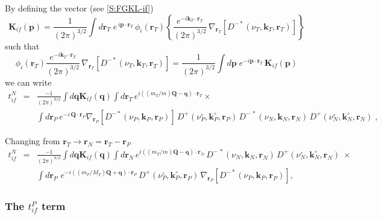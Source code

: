 By defining the vector (see \ref{S:FGKL-if})
\begin{equation}\label{Q:Kif}
  \bm{K}_{if}(\bm{p}) = \frac{1}{(2 \pi)^{3/2}} \int d \bm{r}_{T} \;
e^{\, i \bm{p} \cdot \bm{r}_{T}} \, \phi_{i}(\bm{r}_{T}) \left\{
\frac{e^{- i \bm{k}_{T} \cdot \bm{r}_{T}}}{(2
\pi)^{3/2}}\,\nabla_{\bm{r}_{T}} \left[
D^{-*}(\nu_{T},\bm{k}_{T},\bm{r}_{T}) \right] \right\}
\end{equation}
%
such that
\begin{equation}\label{Q:Fif-inv}
\phi_{i}(\bm{r}_{T}) \frac{ e^{- i \bm{k}_{T} \cdot \bm{r}_{T}}}
{(2 \pi)^{3/2}} \,\nabla_{\bm{r}_{T}} \left[
D^{-*}(\nu_{T},\bm{k}_{T},\bm{r}_{T}) \right]  = \frac{1}{(2
\pi)^{3/2}} \int d \bm{p} \; e^{- i \bm{p} \cdot \bm{r}_{T}}
\,\bm{K}_{if}(\bm{p})
\end{equation}
%
we can write
\begin{eqnarray*}
t^{N}_{if}&=& \frac{-1}{(2 \pi)^{9/2}} \int d \bm{q}
\bm{K}_{if}(\bm{q}) \int d \bm{r}_{T} \, e^{i \left(
(m_{T}/m)\bm{Q} - \bm{q} \right) \cdot \bm{r}_{T}} {\times}
  \\
&& \int d \bm{r}_{P} \, e^{- i \, \bm{Q} \cdot \bm{r}_{P}}
\nabla_{\bm{r}_{P}}\left[ D^{-*}(\nu_{P},\bm{k}_{P},\bm{r}_{P}) \right]
\, D^{+}(\nu_{P}^{\circ},\bm{k}_{P}^{\circ},\bm{r}_{P}) \, D^{-\,\ast}(\nu_{N},
\bm{k}_{N}, \bm{r}_{N} ) \, D^{+}(\nu_{N}^{\circ}, \bm{k}_{N}^{\circ}, \bm{r}_{N}) \;
,\nonumber
\end{eqnarray*}

Changing from $\bm{r}_{T} \to \bm{r}_{N}= \bm{r}_{T} - \bm{r}_{P}$
\begin{eqnarray} \label{Q:tifcdws1}
t^{N}_{if}&=& \frac{-1}{(2 \pi)^{9/2}} \int d \bm{q}
\bm{K}_{if}(\bm{q}) \int d \bm{r}_{N} \, e^{i \left(
(m_{T}/m)\bm{Q} - \bm{q} \right) \cdot \bm{r}_{N}} \,
 D^{-\,\ast}(\nu_{N},
\bm{k}_{N}, \bm{r}_{N} ) \, D^{+}(\nu_{N}^{\circ},\bm{k}_{N}^{\circ},\bm{r}_{N})\; {\times}
  \\
&& \int d \bm{r}_{P} \, \,e^{ -i \left((m_{T}/M_{T})\bm{Q}+
\bm{q} \right) \cdot \bm{r}_{P}} \,
D^{+}(\nu_{P}^{\circ},\bm{k}_{P}^{\circ},\bm{r}_{P}) \, \nabla_{\bm{r}_{P}}\left[
D^{-*}(\nu_{P},\bm{k}_{P},\bm{r}_{P}) \right] ,\nonumber
\end{eqnarray}

\subsubsection{The $t^{P}_{if}$ term}

